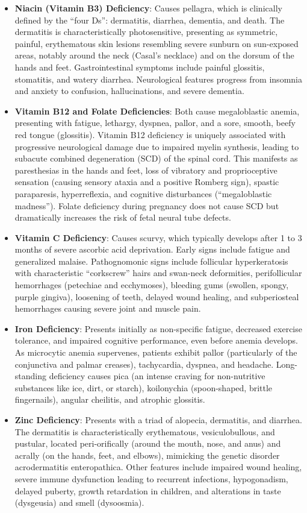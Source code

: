 \begin{itemize}
\item \textbf{Niacin (Vitamin B3) Deficiency}: Causes pellagra, which is clinically defined by the ``four Ds'': dermatitis, diarrhea, dementia, and death. The dermatitis is characteristically photosensitive, presenting as symmetric, painful, erythematous skin lesions resembling severe sunburn on sun-exposed areas, notably around the neck (Casal's necklace) and on the dorsum of the hands and feet. Gastrointestinal symptoms include painful glossitis, stomatitis, and watery diarrhea. Neurological features progress from insomnia and anxiety to confusion, hallucinations, and severe dementia.
\item \textbf{Vitamin B12 and Folate Deficiencies}: Both cause megaloblastic anemia, presenting with fatigue, lethargy, dyspnea, pallor, and a sore, smooth, beefy red tongue (glossitis). Vitamin B12 deficiency is uniquely associated with progressive neurological damage due to impaired myelin synthesis, leading to subacute combined degeneration (SCD) of the spinal cord. This manifests as paresthesias in the hands and feet, loss of vibratory and proprioceptive sensation (causing sensory ataxia and a positive Romberg sign), spastic paraparesis, hyperreflexia, and cognitive disturbances (``megaloblastic madness''). Folate deficiency during pregnancy does not cause SCD but dramatically increases the risk of fetal neural tube defects.
\item \textbf{Vitamin C Deficiency}: Causes scurvy, which typically develops after 1 to 3 months of severe ascorbic acid deprivation. Early signs include fatigue and generalized malaise. Pathognomonic signs include follicular hyperkeratosis with characteristic ``corkscrew'' hairs and swan-neck deformities, perifollicular hemorrhages (petechiae and ecchymoses), bleeding gums (swollen, spongy, purple gingiva), loosening of teeth, delayed wound healing, and subperiosteal hemorrhages causing severe joint and muscle pain.
\item \textbf{Iron Deficiency}: Presents initially as non-specific fatigue, decreased exercise tolerance, and impaired cognitive performance, even before anemia develops. As microcytic anemia supervenes, patients exhibit pallor (particularly of the conjunctiva and palmar creases), tachycardia, dyspnea, and headache. Long-standing deficiency causes pica (an intense craving for non-nutritive substances like ice, dirt, or starch), koilonychia (spoon-shaped, brittle fingernails), angular cheilitis, and atrophic glossitis.
\item \textbf{Zinc Deficiency}: Presents with a triad of alopecia, dermatitis, and diarrhea. The dermatitis is characteristically erythematous, vesiculobullous, and pustular, located peri-orifically (around the mouth, nose, and anus) and acrally (on the hands, feet, and elbows), mimicking the genetic disorder acrodermatitis enteropathica. Other features include impaired wound healing, severe immune dysfunction leading to recurrent infections, hypogonadism, delayed puberty, growth retardation in children, and alterations in taste (dysgeusia) and smell (dysoosmia).
\end{itemize}

